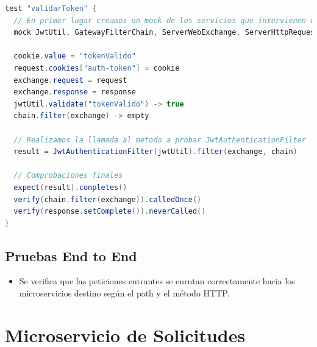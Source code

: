 \begin{lstlisting}[language=Java, caption={Pseudocódigo del test \texttt{validarToken} en \texttt{GatewayServiceTest}}]
test "validarToken" {
  // En primer lugar creamos un mock de los servicios que intervienen en la prueba
  mock JwtUtil, GatewayFilterChain, ServerWebExchange, ServerHttpRequest, ServerHttpResponse, HttpCookie
  
  cookie.value = "tokenValido"
  request.cookies["auth-token"] = cookie
  exchange.request = request
  exchange.response = response
  jwtUtil.validate("tokenValido") -> true
  chain.filter(exchange) -> empty

  // Realizamos la llamada al metodo a probar JwtAuthenticationFilter 
  result = JwtAuthenticationFilter(jwtUtil).filter(exchange, chain)

  // Comprobaciones finales
  expect(result).completes()
  verify(chain.filter(exchange)).calledOnce()
  verify(response.setComplete()).neverCalled()
}
\end{lstlisting}



\subsection{Pruebas End to End}
\begin{itemize}
    \item Se verifica que las peticiones entrantes se enrutan correctamente hacia los microservicios destino según el path y el método HTTP.
\end{itemize}

\section{Microservicio de Solicitudes}

